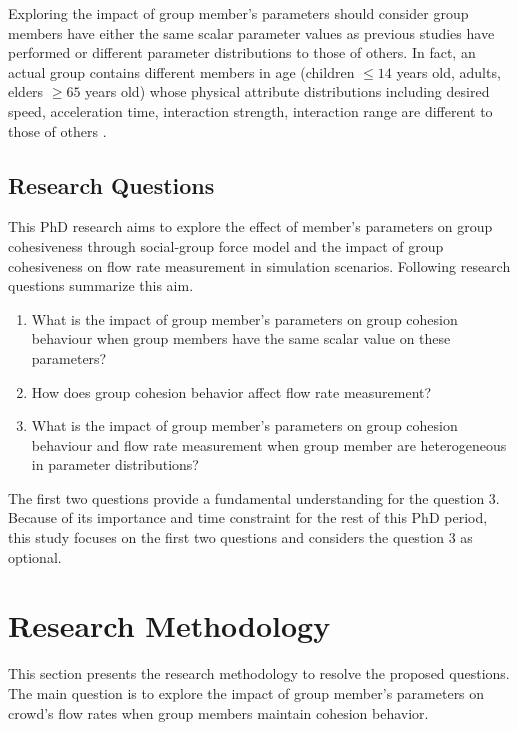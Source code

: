 \documentclass[a4paper,11pt,phdthesis,singlespace,twoside]{cssethesis}
\begin{document}
Exploring the impact of group member’s parameters should consider group members have either the same scalar parameter values as previous studies have performed or different parameter distributions to those of others. In fact, an actual group contains different members in age (children $ \leq 14 $ years old, adults, elders $ \geq 65 $ years old) whose physical attribute distributions including desired speed, acceleration time, interaction strength, interaction range are different to those of others \cite{Daamen2012}. 

\section{Research Questions}
This PhD research aims to explore the effect of member’s parameters on group cohesiveness through social-group force model and the impact of group cohesiveness on flow rate measurement in simulation scenarios. Following research questions summarize this aim.
\begin{enumerate}
\item What is the impact of group member’s parameters on group cohesion behaviour when group members have the same scalar value on these parameters?
\item How does group cohesion behavior affect flow rate measurement?
\item What is the impact of group member’s parameters on group cohesion behaviour and flow rate measurement when group member are heterogeneous in parameter distributions?
\end{enumerate}
The first two questions provide a fundamental understanding for the question 3. Because of its importance and time constraint for the rest of this PhD period, this study focuses on the first two questions and considers the question 3 as optional.

\chapter{Research Methodology}
This section presents the research methodology to resolve the proposed questions. The main question is to explore the impact of group member’s parameters on crowd’s flow rates when group members maintain cohesion behavior.
\end{document}
